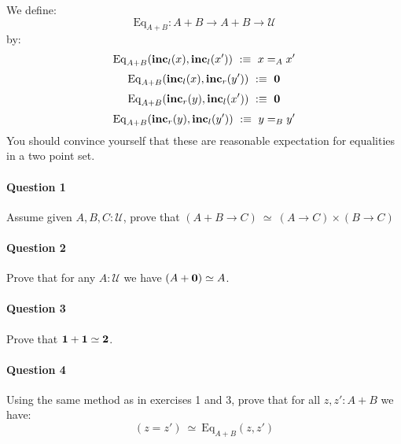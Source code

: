 \documentclass{article}[6pt]%
\newcommand{\U}{{\mathcal U}}
\renewcommand{\r}{\rightarrow}
\newcommand{\inc}{\mathrm{\bf inc}}
\newcommand{\one}{{\bf 1}}
\newcommand{\zero}{{\bf 0}}
\newcommand{\two}{{\bf 2}}
\newcommand{\Eq}{\mathrm{Eq}}
\begin{document}
\begin{Exercise}[title={Sum types}]

We define: 
\[\Eq_{A+B} : A+B \r A+B \r \U\] 
by:
\[\Eq_{A+B}(\inc_l(x),\inc_l(x')) \ :\equiv \ x=_Ax'\]
\[\Eq_{A+B}(\inc_l(x),\inc_r(y')) \ :\equiv \ \zero\]
\[\Eq_{A+B}(\inc_r(y),\inc_l(x')) \ :\equiv \ \zero\]
\[\Eq_{A+B}(\inc_r(y),\inc_l(y')) \ :\equiv \ y=_By'\]
You should convince yourself that these are reasonable expectation for equalities in a two point set.

\paragraph{Question 1} Assume given $A,B,C:\U$, prove that $(A+B\r C) \ \simeq \ (A\r C)\times (B\r C)$

\paragraph{Question 2} Prove that for any $A:\U$ we have $(A+\zero)\simeq A$.

\paragraph{Question 3} Prove that $\one+\one  \simeq  \two$.

\paragraph{Question 4} Using the same method as in exercises 1 and 3, prove that for all $z,z':A+B$ we have:
\[(z=z') \ \simeq\ \Eq_{A+B}(z,z')\]

\end{Exercise}
\end{document}
